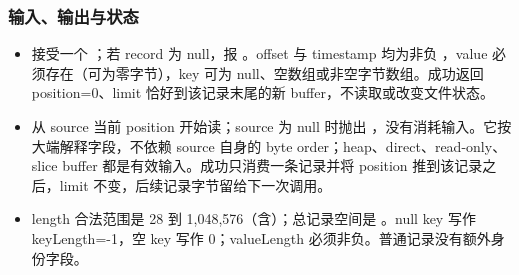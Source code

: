 \subsubsection*{输入、输出与状态}
\begin{itemize}
\item {} 接受一个 ；若 record 为 null，报 。offset 与 timestamp 均为非负 ，value 必须存在（可为零字节），key 可为 null、空数组或非空字节数组。成功返回 position=0、limit 恰好到该记录末尾的新 buffer，不读取或改变文件状态。
\item {} 从 source 当前 position 开始读；source 为 null 时抛出 ，没有消耗输入。它按大端解释字段，不依赖 source 自身的 byte order；heap、direct、read-only、slice buffer 都是有效输入。成功只消费一条记录并将 position 推到该记录之后，limit 不变，后续记录字节留给下一次调用。
\item length 合法范围是 28 到 1,048,576（含）；总记录空间是 。null key 写作 keyLength=-1，空 key 写作 0；valueLength 必须非负。普通记录没有额外身份字段。
\end{itemize}
